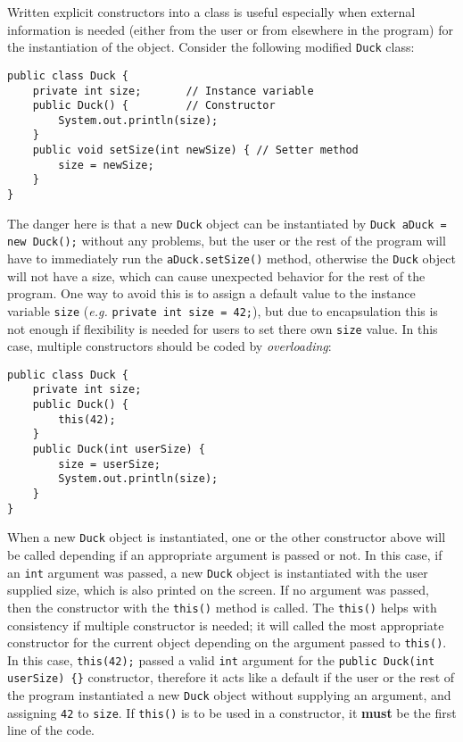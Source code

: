 \documentclass{tufte-handout}
\begin{document}
    Written explicit constructors into a class is useful especially when external information is needed (either from the user or from elsewhere in the program) for the instantiation of the object. Consider the following modified \texttt{Duck} class:

    \begin{lstlisting}
public class Duck {
    private int size;       // Instance variable
    public Duck() {         // Constructor
        System.out.println(size);
    }
    public void setSize(int newSize) { // Setter method
        size = newSize;
    }
}
    \end{lstlisting}

    The danger here is that a new \texttt{Duck} object can be instantiated by \texttt{Duck aDuck = new Duck();} without any problems, but the user or the rest of the program will have to immediately run the \texttt{aDuck.setSize()} method, otherwise the \texttt{Duck} object will not have a size, which can cause unexpected behavior for the rest of the program. One way to avoid this is to assign a default value to the instance variable \texttt{size} (\textit{e.g.} \texttt{private int size = 42;}), but due to encapsulation this is not enough if flexibility is needed for users to set there own \texttt{size} value. In this case, multiple constructors should be coded by \emph{overloading}:

    \begin{lstlisting}
public class Duck {
    private int size;       
    public Duck() {
        this(42);         
    }
    public Duck(int userSize) {
        size = userSize;
        System.out.println(size); 
    }
}
    \end{lstlisting}

    When a new \texttt{Duck} object is instantiated, one or the other constructor above will be called depending if an appropriate argument is passed or not. In this case, if an \texttt{int} argument was passed, a new \texttt{Duck} object is instantiated with the user supplied size, which is also printed on the screen. If no argument was passed, then the constructor with the \texttt{this()} method is called. The \texttt{this()} helps with consistency if multiple constructor is needed; it will called the most appropriate constructor for the current object depending on the argument passed to \texttt{this()}. In this case, \texttt{this(42);} passed a valid \texttt{int} argument for the \texttt{public Duck(int userSize) \{\}} constructor, therefore it acts like a default if the user or the rest of the program instantiated a new \texttt{Duck} object without supplying an argument, and assigning \texttt{42} to \texttt{size}. If \texttt{this()} is to be used in a constructor, it \textbf{must} be the first line of the code.
\end{document}
